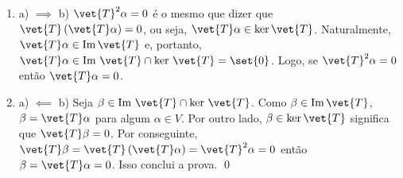 \documentclass[brazil]{homework}
\begin{document}
    \begin{answer}%
        \begin{enumerate}[topsep=0cm, leftmargin=\parindent]
            \item [] a) $\implies$ b) $\vet{T}^2 \alpha = 0$ é o mesmo que dizer que $\vet{T} \left( \vet{T} \alpha \right) = 0$, ou seja, $\vet{T} \alpha \in \text{ker}\,\vet{T}$. Naturalmente, $\vet{T} \alpha \in \text{Im}\, \vet{T}$ e, portanto, $\vet{T} \alpha \in \text{Im}\ \vet{T} \cap \text{ker}\ \vet{T} = \set{0}$. Logo, se $\vet{T}^2 \alpha = 0$ então $\vet{T} \alpha = 0$.
            \item [] a) $\impliedby$ b) Seja $\beta \in \text{Im}\ \vet{T} \cap \text{ker}\ \vet{T}$. Como $\beta \in \text{Im}\,\vet{T}$, $\beta = \vet{T} \alpha$ para algum $\alpha \in V$. Por outro lado, $\beta \in \text{ker}\,\vet{T}$ significa que $\vet{T} \beta = 0$. Por conseguinte, $\vet{T} \beta = \vet{T} \left( \vet{T} \alpha \right) = \vet{T}^2 \alpha = 0$ então $\beta = \vet{T} \alpha = 0$. Isso conclui a prova. \qed
        \end{enumerate}
    \end{answer}


\end{document}
